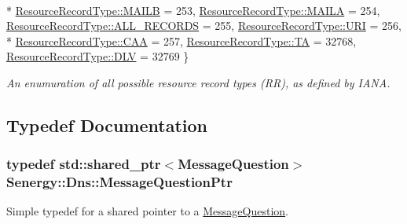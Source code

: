 \begin{DoxyCompactItemize}
\\*
\hyperlink{namespace_senergy_1_1_dns_a590bfd748c955364770f5ce358d9dfe0ae599722792c31154f99048e56b9cf384}{Resource\-Record\-Type\-::\-M\-A\-I\-L\-B} = 253, 
\hyperlink{namespace_senergy_1_1_dns_a590bfd748c955364770f5ce358d9dfe0a59fe37d7dd88b5a7c76146d14db1331f}{Resource\-Record\-Type\-::\-M\-A\-I\-L\-A} = 254, 
\hyperlink{namespace_senergy_1_1_dns_a590bfd748c955364770f5ce358d9dfe0a8261d4e71736b8ae72eae60ff8e18191}{Resource\-Record\-Type\-::\-A\-L\-L\-\_\-\-R\-E\-C\-O\-R\-D\-S} = 255, 
\hyperlink{namespace_senergy_1_1_dns_a590bfd748c955364770f5ce358d9dfe0a8447306210a0972ac94b7d774799df1a}{Resource\-Record\-Type\-::\-U\-R\-I} = 256, 
\\*
\hyperlink{namespace_senergy_1_1_dns_a590bfd748c955364770f5ce358d9dfe0ad7ff895c2bd9c10f958833aeb0289ad4}{Resource\-Record\-Type\-::\-C\-A\-A} = 257, 
\hyperlink{namespace_senergy_1_1_dns_a590bfd748c955364770f5ce358d9dfe0a890a10788493e3d572586e991cd43543}{Resource\-Record\-Type\-::\-T\-A} = 32768, 
\hyperlink{namespace_senergy_1_1_dns_a590bfd748c955364770f5ce358d9dfe0aede320f6102f02f5903553674ed8a3f5}{Resource\-Record\-Type\-::\-D\-L\-V} = 32769
 \}
\begin{DoxyCompactList}\small\item\em An enumuration of all possible resource record types (R\-R), as defined by I\-A\-N\-A. \end{DoxyCompactList}\end{DoxyCompactItemize}


\subsection{Typedef Documentation}
\hypertarget{namespace_senergy_1_1_dns_a425a2a6f3b5c18973c524a99bdfa4ef0}{
\subsubsection[{Message\-Question\-Ptr}]{\setlength{\rightskip}{0pt plus 5cm}typedef std\-::shared\-\_\-ptr$<${\bf Message\-Question}$>$ {\bf Senergy\-::\-Dns\-::\-Message\-Question\-Ptr}}}\label{namespace_senergy_1_1_dns_a425a2a6f3b5c18973c524a99bdfa4ef0}


Simple typedef for a shared pointer to a \hyperlink{class_senergy_1_1_dns_1_1_message_question}{Message\-Question}. 



